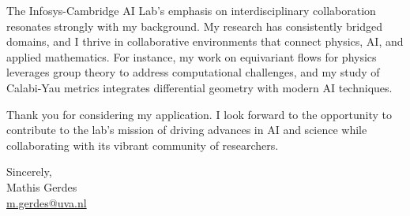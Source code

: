 \documentclass[11pt]{article}
\begin{document}
The Infosys-Cambridge AI Lab's emphasis on interdisciplinary collaboration resonates strongly with my background. My research has consistently bridged domains, and I thrive in collaborative environments that connect physics, AI, and applied mathematics.
For instance, my work on equivariant flows for physics leverages group theory to address computational challenges, and my study of Calabi-Yau metrics integrates differential geometry with modern AI techniques.

Thank you for considering my application. I look forward to the opportunity to contribute to the lab's mission of driving advances in AI and science while collaborating with its vibrant community of researchers.

\noindent
\flushright
Sincerely, \\
Mathis Gerdes \\
\href{mailto:m.gerdes@uva.nl}{m.gerdes@uva.nl}
\end{document}

